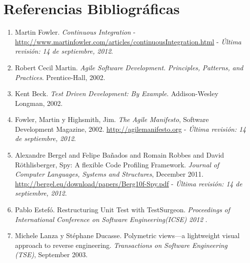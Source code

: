 \documentclass[12pt,spanish,letterpaper]{article}
\begin{document}
\section{Referencias Bibliográficas}
\begin{enumerate}
	\item Martin Fowler. \emph{Continuous Integration} - \url{http://www.martinfowler.com/articles/continuousIntegration.html} - \emph{Última revisión: 14 de septiembre, 2012}. \label{contint}

	\item Robert Cecil Martin. \emph{Agile Software Development. Principles, Patterns, and Practices}. Prentice-Hall, 2002.\label{unclebob}

	\item Kent Beck. \emph{Test Driven Development: By Example}. Addison-Wesley Longman, 2002.\label{tdd-beck}

	\item Fowler, Martin y Highsmith, Jim. \emph{The Agile Manifesto}, Software Development Magazine, 2002. \url{http://agilemanifesto.org} - \emph{Última revisión: 14 de septiembre, 2012}.\label{agilemanifiesto}

	\item Alexandre Bergel and Felipe Ba\~nados and Romain Robbes and David R\"othlisberger, Spy: A flexible Code Profiling Framework. \emph{Journal of Computer Languages, Systems and Structures}, December 2011. \url{http://bergel.eu/download/papers/Berg10f-Spy.pdf} - \emph{Última revisión: 14 de septiembre, 2012}.\label{spy-framework}

	\item Pablo Estefó. Restructuring Unit Test with TestSurgeon. \emph{Proceedings of International Conference on Software Engineering(ICSE) 2012 }. \label{restruct-utests}

	\item Michele Lanza y Stéphane Ducasse. Polymetric views—a lightweight visual approach to reverse engineering. \emph{Transactions on Software Engineering (TSE)}, September 2003. \label{polimetric-views}

\end{enumerate}
\end{document}
